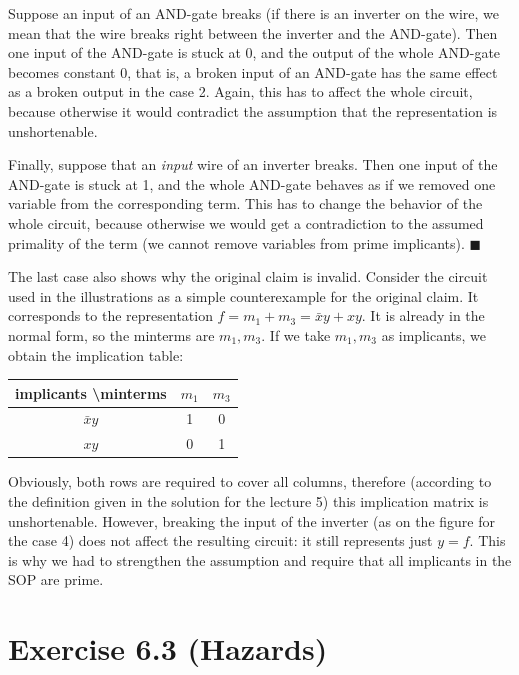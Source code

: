 \documentclass[10pt,a4paper]{scrartcl}
\begin{document}
\FloatBarrier

Suppose an input of an AND-gate breaks (if there is an inverter on the wire, we mean
that the wire breaks right between the inverter and the AND-gate). 
Then one input of the AND-gate is stuck at 0, and the output of the whole 
AND-gate becomes constant $0$, that is, a broken input of an AND-gate has the same 
effect as a broken output in the case 2. Again, this has to affect the whole circuit, 
because otherwise it would contradict the assumption that the representation is
unshortenable.

Finally, suppose that an \emph{input} wire of an inverter breaks. Then one input of the
AND-gate is stuck at 1, and the whole AND-gate behaves as if we removed one variable
from the corresponding term. This has to change the behavior of the whole circuit, 
because otherwise we would get a contradiction to the assumed primality of the term
(we cannot remove variables from prime implicants). \hfill $\blacksquare$

The last case also shows why the original claim is invalid. Consider the circuit used 
in the illustrations as a simple counterexample for the original claim. 
It corresponds to the representation $f = m_1 + m_3 = \bar x y + x y$. It is already in the
normal form, so the minterms are $m_1, m_3$. If we take $m_1, m_3$ as implicants, we 
obtain the implication table:

\vspace{0.5em}
{\centering\begin{tabular}{|c|c|c|}
  \hline
  implicants \textbackslash minterms & $m_1$ & $m_3$ \\
  \hline 
  $\bar x y$ & 1 & 0 \\
  $x y$ & 0 & 1 \\
  \hline
\end{tabular}}
\vspace{0.5em}

Obviously, both rows are required to cover all columns, therefore (according to the
definition given in the solution for the lecture 5) this implication matrix is 
unshortenable. However, breaking the input of the inverter (as on the figure for the
case 4) does not affect the resulting circuit: it still represents just $y = f$. This
is why we had to strengthen the assumption and require that all implicants in the
SOP are prime.

\FloatBarrier
\section*{Exercise 6.3 (Hazards)}
\end{document}
